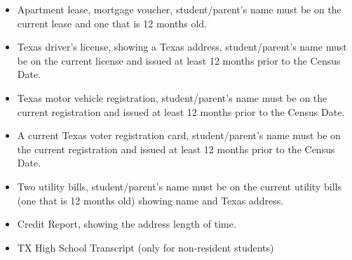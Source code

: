 \documentclass[12pt]{article}
\begin{document}
\begin{itemize}
    \item Apartment lease, mortgage voucher, student/parent's name must be on the current lease and one that is 12 months old.
    \item Texas driver's license, showing a Texas address, student/parent's name must be on the current license and issued at least 12 months prior to the Census Date.
    \item Texas motor vehicle registration, student/parent's name must be on the current registration and issued at least 12 months prior to the Census Date.
    \item A current Texas voter registration card, student/parent's name must be on the current registration and issued at least 12 months prior to the Census Date.
    \item Two utility bills, student/parent's name must be on the current utility bills (one that is 12 months old) showing name and Texas address.
    \item Credit Report, showing the address length of time.
    \item TX High School Transcript (only for non-resident students)
\end{itemize}
\end{document}
